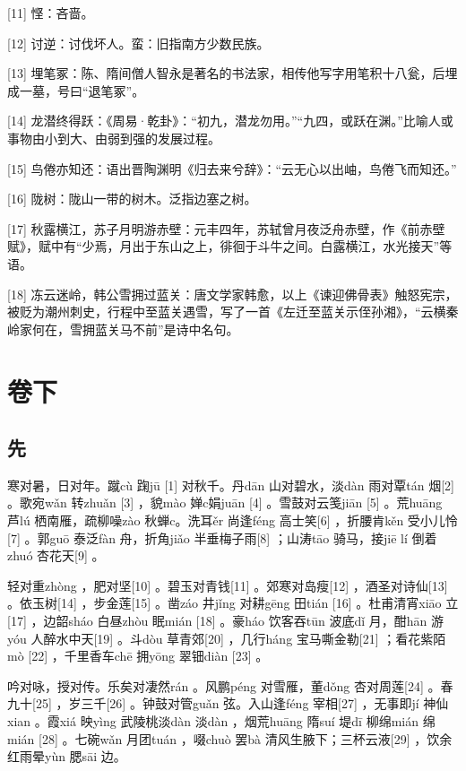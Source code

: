 \documentclass[12pt,UTF8]{ctexbook}
\begin{document}
[11] 悭：吝啬。

[12] 讨逆：讨伐坏人。蛮：旧指南方少数民族。

[13] 埋笔冢：陈、隋间僧人智永是著名的书法家，相传他写字用笔积十八瓮，后埋成一墓，号曰“退笔冢”。

[14] 龙潜终得跃：《周易·乾卦》：“初九，潜龙勿用。”“九四，或跃在渊。”比喻人或事物由小到大、由弱到强的发展过程。

[15] 鸟倦亦知还：语出晋陶渊明《归去来兮辞》：“云无心以出岫，鸟倦飞而知还。”

[16] 陇树：陇山一带的树木。泛指边塞之树。

[17] 秋露横江，苏子月明游赤壁：元丰四年，苏轼曾月夜泛舟赤壁，作《前赤壁赋》，赋中有“少焉，月出于东山之上，徘徊于斗牛之间。白露横江，水光接天”等语。

[18] 冻云迷岭，韩公雪拥过蓝关：唐文学家韩愈，以上《谏迎佛骨表》触怒宪宗，被贬为潮州刺史，行程中至蓝关遇雪，写了一首《左迁至蓝关示侄孙湘》，“云横秦岭家何在，雪拥蓝关马不前”是诗中名句。





\part{卷下}

\setcounter{chapter}{0}

\chapter{先}


寒对暑，日对年。蹴cù 踘jū [1] 对秋千。丹dān 山对碧水，淡dàn 雨对覃tán 烟[2] 。歌宛wǎn 转zhuǎn [3] ，貌mào 婵c娟juān [4] 。雪鼓对云笺jiān [5] 。荒huāng 芦lú 栖南雁，疏柳噪zào 秋蝉c。洗耳ěr 尚逢féng 高士笑[6] ，折腰肯kěn 受小儿怜[7] 。郭guō 泰泛fàn 舟，折角jiǎo 半垂梅子雨[8] ；山涛tāo 骑马，接jiē lí 倒着zhuó 杏花天[9] 。

轻对重zhòng ，肥对坚[10] 。碧玉对青钱[11] 。郊寒对岛瘦[12] ，酒圣对诗仙[13] 。依玉树[14] ，步金莲[15] 。凿záo 井jǐng 对耕gēng 田tián [16] 。杜甫清宵xiāo 立[17] ，边韶sháo 白昼zhòu 眠mián [18] 。豪háo 饮客吞tūn 波底dǐ 月，酣hān 游yóu 人醉水中天[19] 。斗dòu 草青郊[20] ，几行háng 宝马嘶金勒[21] ；看花紫陌mò [22] ，千里香车chē 拥yōng 翠钿diàn [23] 。

吟对咏，授对传。乐矣对凄然rán 。风鹏péng 对雪雁，董dǒng 杏对周莲[24] 。春九十[25] ，岁三千[26] 。钟鼓对管guǎn 弦。入山逢féng 宰相[27] ，无事即jí 神仙xian 。霞xiá 映yìng 武陵桃淡dàn 淡dàn ，烟荒huāng 隋suí 堤dī 柳绵mián 绵mián [28] 。七碗wǎn 月团tuán ，啜chuò 罢bà 清风生腋下；三杯云液[29] ，饮余红雨晕yùn 腮sāi 边。
\end{document}
